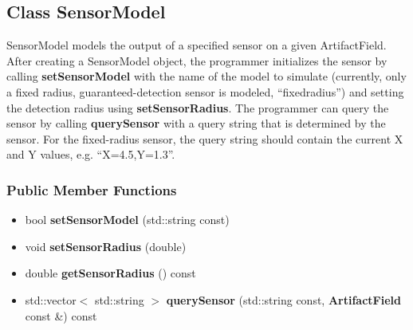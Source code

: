 \subsection{Class SensorModel}
\label{classSensorModel}
SensorModel models the output of a specified sensor on a given ArtifactField.  After creating a SensorModel object, the programmer initializes the sensor by calling {\bf set\-Sensor\-Model} with the name of the model to simulate (currently, only a fixed radius, guaranteed-detection sensor is modeled, ``fixedradius'') and setting the detection radius using {\bf set\-Sensor\-Radius}.  The programmer can query the sensor by calling {\bf query\-Sensor} with a query string that is determined by the sensor.  For the fixed-radius sensor, the query string should contain the current X and Y values, e.g. ``X=4.5,Y=1.3''.

\subsubsection*{Public Member Functions}
\begin{itemize}
\item bool {\bf set\-Sensor\-Model} (std::string const)
\item void {\bf set\-Sensor\-Radius} (double)
\item double {\bf get\-Sensor\-Radius} () const
\item std::vector$<$ std::string $>$ {\bf query\-Sensor} (std::string const, {\bf Artifact\-Field} const \&) const
\end{itemize}

